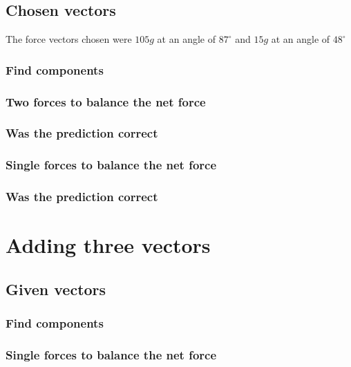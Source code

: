 \documentclass[11pt, letterpaper, includehead]{article}
\begin{document}
\subsection{Chosen vectors} %
The force vectors chosen were $105g$ at an angle of $87^{\circ}$ and $15g$ at an angle of $48^{\circ}$

\subsubsection{Find components} %

\subsubsection{Two forces to balance the net force} %

\subsubsection{Was the prediction correct} %

\subsubsection{Single forces to balance the net force} %

\subsubsection{Was the prediction correct} %

\section{Adding three vectors} %

\subsection{Given vectors} %

\subsubsection{Find components} %

\subsubsection{Single forces to balance the net force} %
\end{document}
